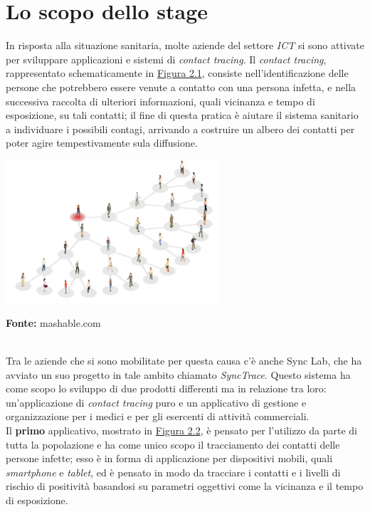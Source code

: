 
\section{Lo scopo dello stage}
In risposta alla situazione sanitaria, molte aziende del settore \textit{ICT} si sono attivate per sviluppare applicazioni e sistemi di \textit{contact tracing}. Il \textit{contact tracing}, rappresentato schematicamente in \hyperref[img:contacttracing]{Figura 2.1}, consiste nell'identificazione delle persone che potrebbero essere venute a contatto con una persona infetta, e nella successiva raccolta di ulteriori informazioni, quali vicinanza e tempo di esposizione, su tali contatti; il fine di questa pratica è aiutare il sistema sanitario a individuare i possibili contagi, arrivando a costruire un albero dei contatti per poter agire tempestivamente sula diffusione. \\

\begin{minipage}{\linewidth}
  \label{img:contacttracing}
  \centering
    \includegraphics[height=5.3cm]{immagini/contacttracing}
  \caption*{\textbf{Fonte:} mashable.com}
\end{minipage} \\

Tra le aziende che si sono mobilitate per questa causa c'è anche Sync Lab, che ha avviato un suo progetto in tale ambito chiamato \textit{SyncTrace}. Questo sistema ha come scopo lo sviluppo di due prodotti differenti ma in relazione tra loro: un'applicazione di \textit{contact tracing} puro e un applicativo di gestione e organizzazione per i medici e per gli esercenti di attività commerciali. \\

Il \textbf{primo} applicativo, mostrato in \hyperref[img:synctraceandroid]{Figura 2.2}, è pensato per l'utilizzo da parte di tutta la popolazione e ha come unico scopo il tracciamento dei contatti delle persone infette; esso è in forma di applicazione per dispositivi mobili, quali \textit{smartphone} e \textit{tablet}, ed è pensato in modo da tracciare i contatti e i livelli di rischio di positività basandosi su parametri oggettivi come la vicinanza e il tempo di esposizione. \\


